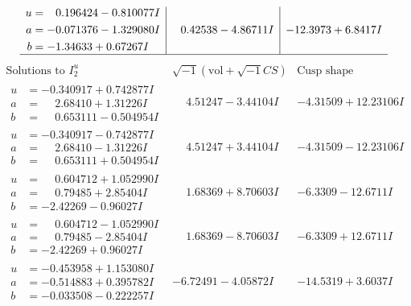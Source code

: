 \documentclass[1p]{elsarticle_modified}
\theoremstyle{definition}
\newcommand{\I}{\sqrt{-1}}
\begin{document}
$$\begin{array}{c|c|c}
\begin{aligned}
u &= \phantom{-}0.196424 - 0.810077 I \\
a &= -0.071376 - 1.329080 I \\
b &= -1.34633 + 0.67267 I\end{aligned}
 & \phantom{-}0.42538 - 4.86711 I & -12.3973 + 6.8417 I\\
 \hline 
 \end{array}$$\newpage$$\begin{array}{c|c|c}  
\text{Solutions to }I^u_{2}& \I (\text{vol} + \sqrt{-1}CS) & \text{Cusp shape}\\
 \hline 
\begin{aligned}
u &= -0.340917 + 0.742877 I \\
a &= \phantom{-}2.68410 + 1.31226 I \\
b &= \phantom{-}0.653111 - 0.504954 I\end{aligned}
 & \phantom{-}4.51247 - 3.44104 I & -4.31509 + 12.23106 I \\ \hline\begin{aligned}
u &= -0.340917 - 0.742877 I \\
a &= \phantom{-}2.68410 - 1.31226 I \\
b &= \phantom{-}0.653111 + 0.504954 I\end{aligned}
 & \phantom{-}4.51247 + 3.44104 I & -4.31509 - 12.23106 I \\ \hline\begin{aligned}
u &= \phantom{-}0.604712 + 1.052990 I \\
a &= \phantom{-}0.79485 + 2.85404 I \\
b &= -2.42269 - 0.96027 I\end{aligned}
 & \phantom{-}1.68369 + 8.70603 I & -6.3309 - 12.6711 I \\ \hline\begin{aligned}
u &= \phantom{-}0.604712 - 1.052990 I \\
a &= \phantom{-}0.79485 - 2.85404 I \\
b &= -2.42269 + 0.96027 I\end{aligned}
 & \phantom{-}1.68369 - 8.70603 I & -6.3309 + 12.6711 I \\ \hline\begin{aligned}
u &= -0.453958 + 1.153080 I \\
a &= -0.514883 + 0.395782 I \\
b &= -0.033508 - 0.222257 I\end{aligned}
 & -6.72491 - 4.05872 I & -14.5319 + 3.6037 I \\ \hline\begin{aligned}

\end{aligned}
\end{array}$$
\end{document}
